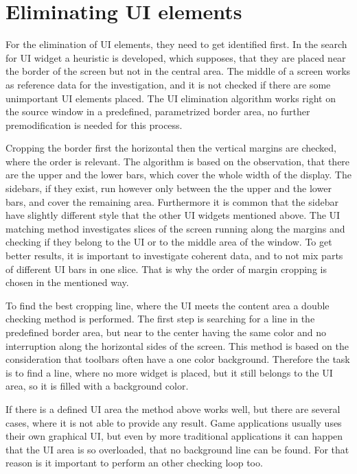 \documentclass[draft,final]{vutinfth} %
\begin{document}
	\section{Eliminating UI elements}
	For the elimination of UI elements, they need to get identified first.
	In the search for UI widget a heuristic is developed, which supposes, that they are placed near the border of the screen but not in the central area.
	The middle of a screen works as reference data for the investigation, and it is not checked if there are some unimportant UI elements placed.
	The UI elimination algorithm works right on the source window in a predefined, parametrized border area, no further premodification is needed for this process.\par
	Cropping the border first the horizontal then the vertical margins are checked, where the order is relevant.
	The algorithm is based on the observation, that there are the upper and the lower bars, which cover the whole width of the display.
	The sidebars, if they exist, run however only between the the upper and the lower bars, and cover the remaining area.
	Furthermore it is common that the sidebar have slightly different style that the other UI widgets mentioned above.
	The UI matching method investigates slices of the screen running along the margins and checking if they belong to the UI or to the middle area of the window.
	To get better results, it is important to investigate coherent data, and to not mix parts of different UI bars in one slice.
	That is why the order of margin cropping is chosen in the mentioned way.\par 
	To find the best cropping line, where the UI meets the content area a double checking method is performed.
	The first step is searching for a line in the predefined border area, but near to the center having the same color and no interruption along the horizontal sides of the screen.
	This method is based on the consideration that toolbars often have a one color background.
	Therefore the task is to find a line, where no more widget is placed, but it still belongs to the UI area, so it is filled with a background color.\par
	If there is a defined UI area the method above works well, but there are several cases, where it is not able to provide any result.
	Game applications usually uses their own graphical UI, but even by more traditional applications it can happen that the UI area is so overloaded, that no background line can be found.
	For that reason is it important to perform an other checking loop too.
\end{document}
